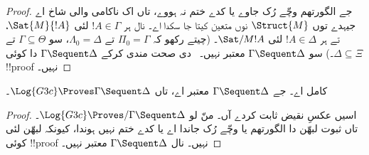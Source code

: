 \documentclass[../../../include/open-logic-section]{subfiles}
\begin{document}
\begin{proof}
جے الگورتھم وچّے رُک جاوے یا کدے ختم نہ ہووے، تاں اک ناکامی والی شاخ اے جیہدے توں $\Struct{M}$ نوں متعین کیتا جا سکدا اے۔  نال ہر $!A \in \Gamma$ لئی $\Sat{M}{!A}$، تے ہر $!A \in \Delta$ لئی $\Sat/{M}{!A}$۔ (چیتے رکھو کہ $\Pi_0 = \Gamma$ تے $\Lambda_0 =
\Delta$، سو $\Gamma \subseteq \Theta$ تے $\Delta \subseteq \Xi$۔) سو $ \Gamma \Sequent \Delta$ معتبر نہیں۔~ دی صحت مندی کرکے $ \Gamma \Sequent \Delta$ دا کوئی !!{proof} نہیں۔
\end{proof}

\begin{cor}
 کامل اے۔ جے $ \Gamma \Sequent \Delta$ معتبر اے، تاں $\Log{G3c} \Proves \Gamma \Sequent \Delta$۔
\end{cor}

\begin{proof}
اسیں عکسِ نقیض ثابت کردے آں۔ منّ لو $ \Log{G3c} \Proves/ \Gamma
\Sequent \Delta$۔ تاں ثبوت لبھّن دا الگورتھم یا وچّے رُک جاندا اے یا کدے ختم نہیں ہوندا، کیونکہ لبھّن لئی کوئی !!{proof} نہیں۔  نال $ \Gamma \Sequent \Delta$ معتبر نہیں۔
\end{proof}
\end{document}
